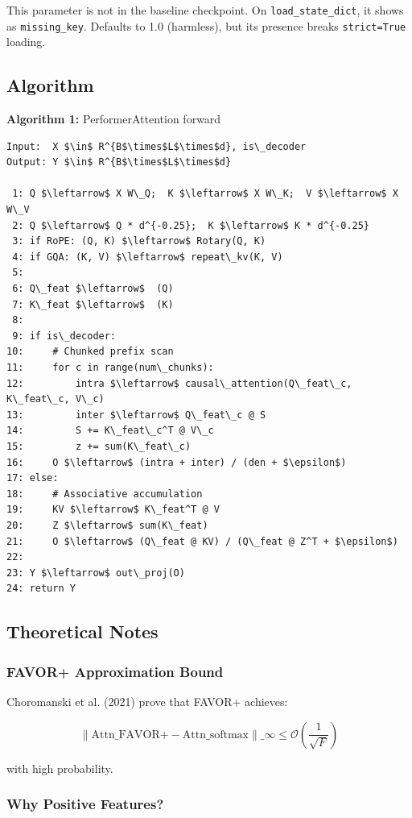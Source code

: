 This parameter is not in the baseline checkpoint. On \texttt{load\_state\_dict}, it 
shows as \texttt{missing\_key}. Defaults to 1.0 (harmless), but its presence breaks 
\texttt{strict=True} loading.

\subsection{Algorithm}

\textbf{Algorithm 1:} PerformerAttention forward
\begin{lstlisting}
Input:  X $\in$ R^{B$\times$L$\times$d}, is\_decoder
Output: Y $\in$ R^{B$\times$L$\times$d}

 1: Q $\leftarrow$ X W\_Q;  K $\leftarrow$ X W\_K;  V $\leftarrow$ X W\_V
 2: Q $\leftarrow$ Q * d^{-0.25};  K $\leftarrow$ K * d^{-0.25}
 3: if RoPE: (Q, K) $\leftarrow$ Rotary(Q, K)
 4: if GQA: (K, V) $\leftarrow$ repeat\_kv(K, V)
 5:
 6: Q\_feat $\leftarrow$  (Q)
 7: K\_feat $\leftarrow$  (K)
 8:
 9: if is\_decoder:
10:     # Chunked prefix scan
11:     for c in range(num\_chunks):
12:         intra $\leftarrow$ causal\_attention(Q\_feat\_c, K\_feat\_c, V\_c)
13:         inter $\leftarrow$ Q\_feat\_c @ S
14:         S += K\_feat\_c^T @ V\_c
15:         z += sum(K\_feat\_c)
16:     O $\leftarrow$ (intra + inter) / (den + $\epsilon$)
17: else:
18:     # Associative accumulation
19:     KV $\leftarrow$ K\_feat^T @ V
20:     Z $\leftarrow$ sum(K\_feat)
21:     O $\leftarrow$ (Q\_feat @ KV) / (Q\_feat @ Z^T + $\epsilon$)
22:
23: Y $\leftarrow$ out\_proj(O)
24: return Y
\end{lstlisting}

\subsection{Theoretical Notes}

\subsubsection{FAVOR+ Approximation Bound}

Choromanski et al. (2021) prove that FAVOR+ achieves:

\[
\|\text{Attn}\_{\text{FAVOR+}} - \text{Attn}\_{\text{softmax}}\|\_\infty \leq \mathcal{O}\!\left(\frac{1}{\sqrt{F}}\right)
\tag{4.7}
\]

with high probability.

\subsubsection{Why Positive Features?}

